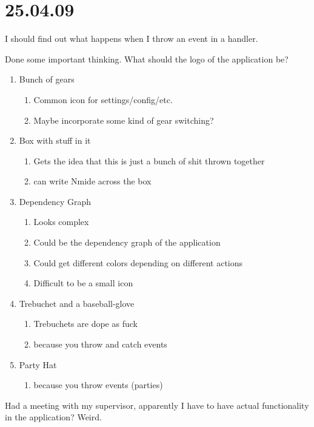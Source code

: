 \section{25.04.09}

I should find out what happens when I throw an event in a handler.

Done some important thinking. What should the logo of the application be?

\begin{enumerate}
  \item Bunch of gears
  \begin{enumerate}
    \item Common icon for settings/config/etc.
    \item Maybe incorporate some kind of gear switching?
  \end{enumerate}
  \item Box with stuff in it
  \begin{enumerate}
    \item Gets the idea that this is just a bunch of shit thrown together
    \item can write Nmide across the box
  \end{enumerate}
  \item Dependency Graph
  \begin{enumerate}
    \item Looks complex
    \item Could be the dependency graph of the application
    \item Could get different colors depending on different actions
    \item Difficult to be a small icon
  \end{enumerate}
  \item Trebuchet and a baseball-glove
  \begin{enumerate}
    \item Trebuchets are dope as fuck
    \item because you throw and catch events
  \end{enumerate}
  \item Party Hat
  \begin{enumerate}
    \item because you throw events (parties)
  \end{enumerate}
\end{enumerate}

Had a meeting with my supervisor, apparently I have to have actual functionality
in the application? Weird.

